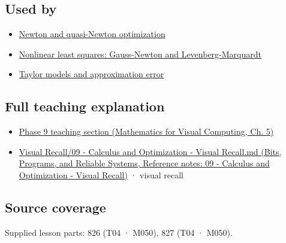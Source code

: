 \subsection{Used by}\label{appendix-6ac071f8b50c-used-by}

\hypertarget{appendix-6ac071f8b50c-used-by}{}

\begin{itemize}
\tightlist
\item
  \hyperref[appendix-54c8f5828387]{Newton and quasi-Newton optimization}
\item
  \hyperref[appendix-2c2df8345991]{Nonlinear least squares: Gauss-Newton and Levenberg-Marquardt}
\item
  \hyperref[appendix-32f39e9a3738]{Taylor models and approximation error}
\end{itemize}

\subsection{Full teaching explanation}\label{appendix-6ac071f8b50c-full-teaching-explanation}

\hypertarget{appendix-6ac071f8b50c-full-teaching-explanation}{}

\begin{itemize}
\tightlist
\item
  \href{../02-Mathematics-for-Visual-Computing/main.pdf\#nameddest=02-foundations-ii-ch021-jacobians-curvature-and-local-approximation}{Phase 9 teaching section (Mathematics for Visual Computing, Ch. 5)}
\item
  \href{../01-Bits-Programs-and-Reliable-Systems/main.pdf\#nameddest=appendix-adf48f5dc5c1}{Visual Recall/09 - Calculus and Optimization - Visual Recall.md (Bits, Programs, and Reliable Systems, Reference notes: 09 - Calculus and Optimization - Visual Recall)} · visual recall
\end{itemize}

\subsection{Source coverage}\label{appendix-6ac071f8b50c-source-coverage}

\hypertarget{appendix-6ac071f8b50c-source-coverage}{}

Supplied lesson parts: 826 (T04 · M050), 827 (T04 · M050).
